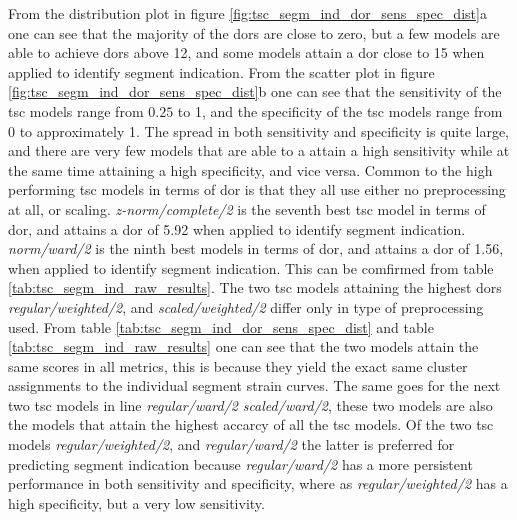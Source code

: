 From the distribution plot in figure \ref{fig:tsc_segm_ind_dor_sens_spec_dist}a one can see that the majority of the \acrshort{dor}s are close to zero, but a few models are able to achieve \acrshort{dor}s above 12, and some models attain a \acrshort{dor} close to 15 when applied to identify segment indication. From the scatter plot in figure \ref{fig:tsc_segm_ind_dor_sens_spec_dist}b one can see that the sensitivity of the \acrshort{tsc} models range from $0.25$ to 1, and the specificity of the \acrshort{tsc} models range from 0 to approximately 1. The spread in both sensitivity and specificity is quite large, and there are very few models that are able to a attain a high sensitivity while at the same time attaining a high specificity, and vice versa. Common to the high performing \acrshort{tsc} models in terms of \acrshort{dor} is that they all use either no preprocessing at all, or scaling. \textit{z-norm/complete/2} is the seventh best \acrshort{tsc} model in terms of \acrshort{dor}, and attains a \acrshort{dor} of 5.92 when applied to identify segment indication. \textit{norm/ward/2} is the ninth best models in terms of \acrshort{dor}, and attains a \acrshort{dor} of 1.56, when applied to identify segment indication. This can be comfirmed from table \ref{tab:tsc_segm_ind_raw_results}. The two \acrshort{tsc} models attaining the highest \acrshort{dor}s \textit{regular/weighted/2}, and \textit{scaled/weighted/2} differ only in type of preprocessing used. From table \ref{tab:tsc_segm_ind_dor_sens_spec_dist} and table \ref{tab:tsc_segm_ind_raw_results} one can see that the two models attain the same scores in all metrics, this is because they yield the exact same cluster assignments to the individual segment strain curves. The same goes for the next two \acrshort{tsc} models in line \textit{regular/ward/2} \textit{scaled/ward/2}, these two models are also the models that attain the highest accarcy of all the \acrshort{tsc} models. Of the two \acrshort{tsc} models \textit{regular/weighted/2}, and \textit{regular/ward/2} the latter is preferred for predicting segment indication because \textit{regular/ward/2} has a more persistent performance in both sensitivity and specificity, where as \textit{regular/weighted/2} has a high specificity, but a very low sensitivity.

